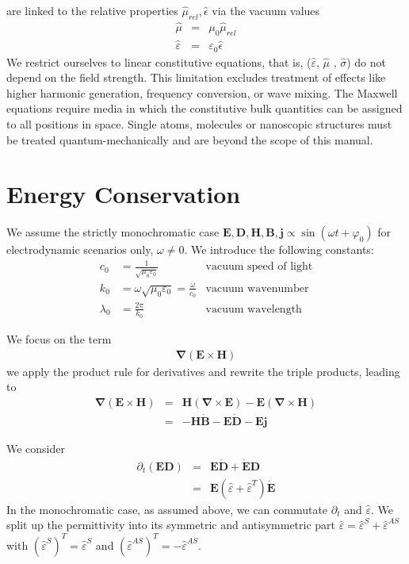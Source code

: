\documentclass[12pt,a4paper,twoside,openright,BCOR10mm,headsepline,titlepage,abstracton,chapterprefix,final]{scrreprt}
\newcommand\Vector[1]{{\mathbf{#1}}}
\newcommand\vacuum{0}
\newcommand\wavenumber{k}
\newcommand\Nabla{\Vector{\nabla}}
\newcommand\timederivative[1]{\dot{{#1}}}
\newcommand\Tensor[1]{\hat{#1}}
\newcommand\scalarEfield{E}
\newcommand\scalarBfield{B}
\newcommand\scalarHfield{H}
\newcommand\scalarDfield{D}
\newcommand\Efield{\Vector{\scalarEfield}}
\newcommand\Bfield{\Vector{\scalarBfield}}
\newcommand\Hfield{\Vector{\scalarHfield}}
\newcommand\Dfield{\Vector{\scalarDfield}}
\newcommand\permeability{\Tensor{\scalarpermeability}}
\newcommand\vacuumpermeability{\scalarpermeability_{\vacuum}}
\newcommand\scalarpermeability{\mu}
\newcommand\relativepermeability{\Tensor{\mu}_{rel}}
\newcommand\permittivity{\Tensor{\scalarpermittivity}}
\newcommand\vacuumpermittivity{\scalarpermittivity_{\vacuum}}
\newcommand\scalarrelativepermittivity{\epsilon}
\newcommand\relativepermittivity{\Tensor{\scalarrelativepermittivity}}
\newcommand\scalarpermittivity{\varepsilon}
\newcommand\conductivity{\Tensor{\sigma}}
\newcommand\currentdensity{\Vector{j}}
\begin{document}
are linked to the relative properties $\relativepermeability, \relativepermittivity$ via
the vacuum values
\begin{eqnarray}
 \permeability &=& \vacuumpermeability \relativepermeability \\
 \permittivity &=& \vacuumpermittivity \relativepermittivity
\end{eqnarray}
We restrict ourselves to linear constitutive equations, that is, ($\permittivity$, $\permeability$ , $\conductivity$) do not depend on the field strength.
This limitation excludes treatment of effects like higher harmonic generation, frequency conversion, or wave mixing.
The Maxwell equations require media in which the constitutive bulk quantities can be assigned to all positions in space.
Single atoms, molecules or nanoscopic structures must be treated quantum-mechanically and are beyond the scope of this manual.

\section{Energy Conservation}
We assume the strictly monochromatic case $\Efield,\Dfield,\Hfield,\Bfield, \currentdensity \propto \sin(\omega t + \varphi_0)$ for electrodynamic scenarios only, $\omega \neq 0$.
We introduce the following constants:
\begin{align}
 c_\vacuum &= \frac{1}{\sqrt{\vacuumpermeability\vacuumpermittivity}} & \textrm{vacuum speed of light} \\
 \wavenumber_\vacuum &= \omega \sqrt{\vacuumpermeability\vacuumpermittivity} = \frac{\omega}{c_\vacuum}& \textrm{vacuum wavenumber} \\
 \lambda_\vacuum &= \frac{2\pi}{\wavenumber_\vacuum} & \textrm{vacuum wavelength}
\end{align}

We focus on the term
\begin{eqnarray}
   \Nabla ( \Efield \times \Hfield )
\end{eqnarray}
we apply the product rule for derivatives and rewrite the triple products, leading to
\begin{eqnarray}
   \Nabla ( \Efield \times \Hfield ) &=& \Hfield ( \Nabla \times \Efield ) - \Efield ( \Nabla \times \Hfield ) \\
   &=& - \Hfield \timederivative{\Bfield} - \Efield  \timederivative{\Dfield} - \Efield \currentdensity
\end{eqnarray}

We consider
\begin{eqnarray}
 \partial_t (\Efield \Dfield) &=& \Efield  \timederivative{\Dfield} +  \timederivative{\Efield} \Dfield \\
                              &=& \Efield ( \permittivity + \permittivity^T ) \timederivative{\Efield} 
\end{eqnarray}
In the monochromatic case, as assumed above, we can commutate $\partial_t$ and $\permittivity$.
We split up the permittivity into its symmetric and antisymmetric part $\permittivity =  \permittivity^S +  \permittivity^{AS}$ with
$(\permittivity^S)^T = \permittivity^S$ and $(\permittivity^{AS})^T = - \permittivity^{AS}$. 
\end{document}
